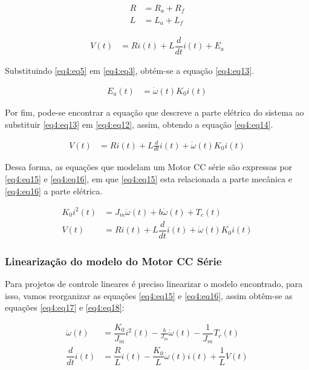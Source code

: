 \begin{align}
	R &= R_a + R_f          \label{eq4:eq10}\\        
	L &= L_a + L_f          \label{eq4:eq11}
\end{align}

\begin{align}
	V(t) &= Ri(t)+ L\dfrac{d}{dt}i(t) + E_a \label{eq4:eq12}
\end{align}

Substituindo \ref{eq4:eq5} em \ref{eq4:eq3}, obtém-se a equação \ref{eq4:eq13}.

\begin{align}
	E_a(t) &= \dot{\omega}(t)K_0 i(t) \label{eq4:eq13}
\end{align}

Por fim, pode-se encontrar a equação que descreve a parte elétrica do sistema ao substituir \ref{eq4:eq13} em \ref{eq4:eq12}, assim, obtendo a equação \ref{eq4:eq14}.

\begin{align}
	V(t) &= Ri(t)+ L\frac{d}{dt}i(t) + \dot{\omega}(t)K_0 i(t) \label{eq4:eq14}
\end{align}

Dessa forma, as equações que modelam um Motor CC série são expressas por \ref{eq4:eq15} e \ref{eq4:eq16}, em que \ref{eq4:eq15} esta relacionada a parte mecânica e \ref{eq4:eq16} a parte elétrica.

\begin{align}
	K_0 i^2(t) &= J_m\ddot{\omega}(t) + b\dot{\omega}(t) + T_c(t) \label{eq4:eq15}\\
	V(t) &= Ri(t)+ L\dfrac{d}{dt}i(t) + \dot{\omega}(t)K_0 i(t) \label{eq4:eq16}
\end{align}

\vspace{1cm}

\subsubsection{Linearização do modelo do Motor CC Série}

Para projetos de controle lineares é preciso linearizar o modelo encontrado, para isso, vamos reorganizar as equações \ref{eq4:eq15} e \ref{eq4:eq16}, assim obtêm-se as equações \ref{eq4:eq17} e \ref{eq4:eq18}:

\begin{align}
    \ddot{\omega}(t) &= \dfrac{K_0}{J_m} i^2(t) - \frac{b}{J_m}\dot{\omega}(t) - \dfrac{1}{J_m}T_c(t) \label{eq4:eq17}\\
    \dfrac{d}{dt}i(t) &= \dfrac{R}{L}i(t)- \dfrac{K_0}{L}\dot{\omega}(t)i(t) +\dfrac{1}{L}V(t) \label{eq4:eq18}
\end{align}

